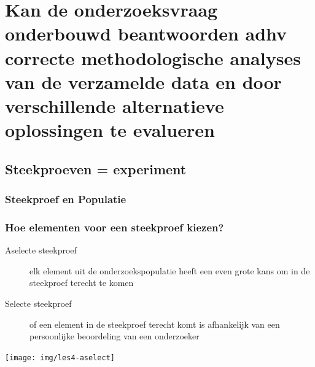 \section{Kan de onderzoeksvraag onderbouwd beantwoorden adhv correcte methodologische analyses van de verzamelde data en door verschillende alternatieve oplossingen te evalueren}
\sectionframe{}

\subsection{Steekproeven = experiment}

\begin{frame}
	\frametitle{Steekproef en Populatie}
	
	
	\begin{center}
	\end{center}
\end{frame}

\begin{frame}
	\frametitle{Hoe elementen voor een steekproef kiezen?}
	
	\begin{description}
		\item[Aselecte steekproef] elk element uit de onderzoekspopulatie heeft een even grote kans om in de steekproef terecht te komen
		\item[Selecte steekproef] of een element in de steekproef terecht komt is afhankelijk van een persoonlijke beoordeling van een onderzoeker
	\end{description}
	
	\begin{center}
		\texttt{[image: img/les4-aselect]}
	\end{center}
\end{frame}

